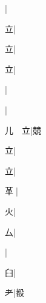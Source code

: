 \begin{multicols}{2}
{{\cjk{}{\cnsym{}　}{\cnsym{}　}{\cnsym{}　}}|{}\par
{\cjk{}{\cnsym{}　}{\cnsym{}　}立}|{}\par
{\cjk{}{\cnsym{}　}{\cnsym{}　}立}|{}\par
{\cjk{}{\cnsym{}　}{\cnsym{}　}立}|{}\par
{}|{}\par
{\cjk{}{\cnsym{}　}{\cnsym{}　}{\cnsym{}　}}|{}\par
{\cjk{}儿{\cnsym{}　}立}|{\cjk{}竸}\par
{立}|{}\par
{立}|{}\par
{\cjk{}{\cnsym{}　}革{\cnxJzr{}}}|{}\par
{\cjk{}{\cnsym{}　}{\cnsym{}　}火}|{}\par
{\cjk{}{\cnsym{}　}{\cnsym{}　}厶}|{}\par
{\cjk{}{\cnsym{}　}{\cnsym{}　}{\cnsym{}　}}|{}\par
{臼}|{}\par
{\cjk{}{\cnsym{}　}{\cnsym{}　}耂}|{\cjk{}殾}\par
}
\end{multicols}
